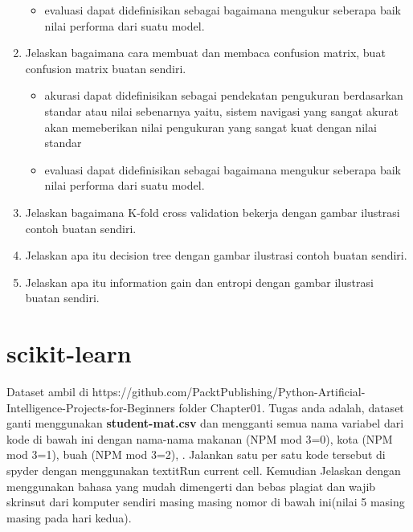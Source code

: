 \begin{enumerate}
\begin{itemize}
		\item evaluasi dapat didefinisikan sebagai bagaimana mengukur seberapa baik nilai performa dari suatu model.
	\end{itemize}
\item
Jelaskan bagaimana cara membuat dan membaca confusion matrix, buat confusion matrix buatan sendiri.
	\begin{itemize}
		\item akurasi dapat didefinisikan sebagai pendekatan pengukuran berdasarkan standar atau nilai sebenarnya yaitu, sistem navigasi yang sangat akurat akan memeberikan nilai pengukuran yang sangat kuat dengan nilai standar
		\item evaluasi dapat didefinisikan sebagai bagaimana mengukur seberapa baik nilai performa dari suatu model.
	\end{itemize}
\item
Jelaskan bagaimana K-fold cross validation bekerja dengan gambar ilustrasi contoh buatan sendiri.
\item
Jelaskan apa itu decision tree dengan gambar ilustrasi contoh buatan sendiri.
\item
Jelaskan apa itu information gain dan entropi dengan gambar ilustrasi buatan sendiri.
\end{enumerate}

\section{scikit-learn}
Dataset ambil di https://github.com/PacktPublishing/Python-Artificial-Intelligence-Projects-for-Beginners folder Chapter01.
Tugas anda adalah, dataset ganti menggunakan \textbf{student-mat.csv} dan mengganti semua nama variabel dari kode di bawah ini dengan nama-nama makanan (NPM mod 3=0), kota (NPM mod 3=1), buah (NPM mod 3=2), . Jalankan satu per satu kode tersebut di spyder dengan menggunakan textit{Run current cell}. Kemudian Jelaskan dengan menggunakan bahasa yang mudah dimengerti dan bebas plagiat dan wajib skrinsut dari komputer sendiri masing masing nomor di bawah ini(nilai 5 masing masing pada hari kedua).

